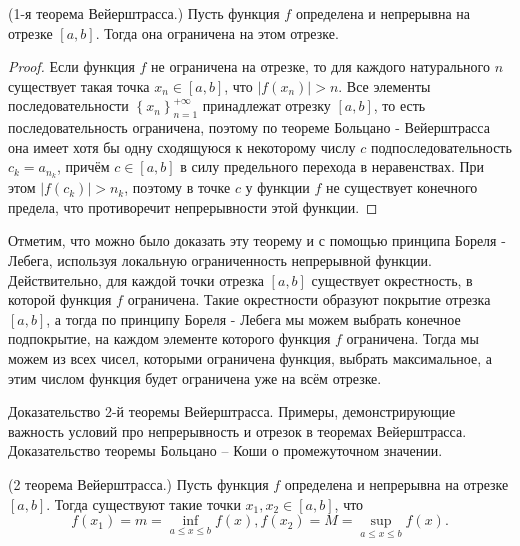 \begin{theorem}
    (1-я теорема Вейерштрасса.) Пусть функция $f$ определена и непрерывна на отрезке $[a, b]$. Тогда она ограничена на этом отрезке.
\end{theorem}

\begin{proof}
    Если функция $f$ не ограничена на отрезке, то для каждого натурального $n$ существует такая точка $x_n \in[a, b]$, что $\left|f\left(x_n\right)\right|>n$. Все элементы последовательности $\left\{x_n\right\}_{n=1}^{+\infty}$ принадлежат отрезку $[a, b]$, то есть последовательность ограничена, поэтому по теореме Больцано - Вейерштрасса она имеет хотя бы одну сходящуюся к некоторому числу $c$ подпоследовательность $c_k=a_{n_k}$, причём $c \in[a, b]$ в силу предельного перехода в неравенствах. При этом $\left|f\left(c_k\right)\right|>n_k$, поэтому в точке $c$ у функции $f$ не существует конечного предела, что противоречит непрерывности этой функции.
\end{proof}

Отметим, что можно было доказать эту теорему и с помощью принципа Бореля - Лебега, используя локальную ограниченность непрерывной функции. Действительно, для каждой точки отрезка $[a, b]$ существует окрестность, в которой функция $f$ ограничена. Такие окрестности образуют покрытие отрезка $[a, b]$, а тогда по принципу Бореля - Лебега мы можем выбрать конечное подпокрытие, на каждом элементе которого функция $f$ ограничена. Тогда мы можем из всех чисел, которыми ограничена функция, выбрать максимальное, а этим числом функция будет ограничена уже на всём отрезке.

\newpage
\begin{problem}
Доказательство 2-й теоремы Вейерштрасса. Примеры, демонстрирующие важность условий про непрерывность и отрезок в теоремах Вейерштрасса. Доказательство теоремы
Больцано – Коши о промежуточном значении.
\end{problem}
\begin{theorem}
    (2 теорема Вейерштрасса.) Пусть функция $f$ определена и непрерывна
    на отрезке $[a, b]$. Тогда существуют такие точки $x_1, x_2 \in[a, b]$, что
    $$
        f\left(x_1\right)=m=\inf _{a \leq x \leq b} f(x), f\left(x_2\right)=M=\sup _{a \leq x \leq b} f(x) .
    $$
\end{theorem}

